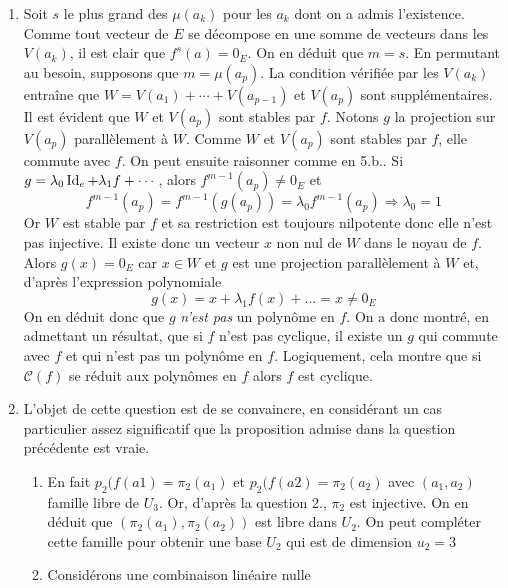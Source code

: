 \begin{enumerate}
 \item Soit $s$ le plus grand des $\mu(a_k)$ pour les $a_k$ dont on a admis l'existence. Comme tout vecteur de $E$ se décompose en une somme de vecteurs dans les $V(a_k)$,  il est clair que $f^s(a)=0_E$. On en déduit que $m=s$. En permutant au besoin, supposons que $m=\mu(a_p)$.\newline
La condition vérifiée par les $V(a_k)$ entraîne que $W=V(a_1)+\cdots+V(a_{p-1})$ et $V(a_p)$ sont supplémentaires. Il est évident que $W$ et $V(a_p)$ sont stables par $f$. Notons $g$ la projection sur $V(a_p)$ parallèlement à $W$. Comme $W$ et $V(a_p)$ sont stables par $f$, elle commute avec $f$. On peut ensuite raisonner comme en 5.b..\newline
Si $g=\lambda_0 \operatorname{Id}_e + \lambda_1 f + \cdots$, alors $f^{m-1}(a_p)\neq 0_E$ et
\begin{displaymath}
f^{m-1}(a_p)= f^{m-1}(g(a_p))= \lambda_0 f^{m-1}(a_p)\Rightarrow \lambda_0 = 1
\end{displaymath}
Or $W$ est stable par $f$ et sa restriction est toujours nilpotente donc elle n'est pas injective. Il existe donc un vecteur $x$ non nul de $W$ dans le noyau de $f$. Alors $g(x)=0_E$ car $x\in W$ et $g$ est une projection parallèlement à $W$ et, d'après l'expression polynomiale
\begin{displaymath}
 g(x) = x +\lambda_1f(x)+...=x\neq 0_E
\end{displaymath}
On en déduit donc que $g$ \emph{n'est pas} un polynôme en $f$.\newline
On a donc montré, en admettant un résultat, que si $f$ n'est pas cyclique, il existe un $g$ qui commute avec $f$ et qui n'est pas un polynôme en $f$. Logiquement, cela montre que si $\mathcal{C}(f)$ se réduit aux polynômes en $f$ alors $f$ est cyclique.
 \item L'objet de cette question est de se convaincre, en considérant un cas particulier assez significatif que la proposition admise dans la question précédente est vraie.
\begin{enumerate}
 \item En fait $p_2(f(a1)=\pi_2(a_1)$ et $p_2(f(a2)=\pi_2(a_2)$ avec $(a_1,a_2)$ famille libre de $U_3$. Or, d'après la question 2., $\pi_2$ est injective. On en déduit que $(\pi_2(a_1),\pi_2(a_2))$ est libre dans $U_2$. On peut compléter cette famille pour obtenir une base $U_2$ qui est de dimension $u_2=3$
 \item Considérons une combinaison linéaire nulle
\begin{multline*}

\end{multline*}
\end{enumerate}
\end{enumerate}
